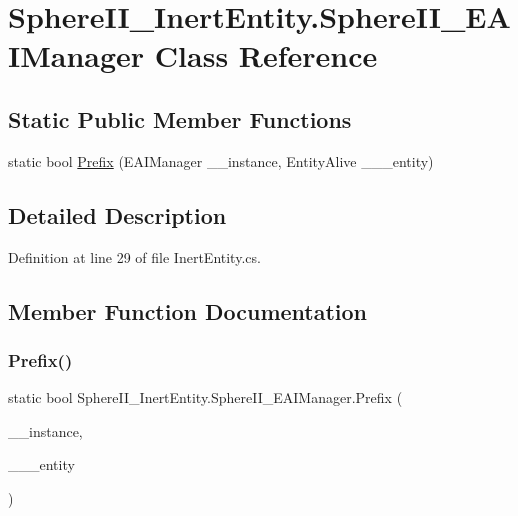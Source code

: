 \hypertarget{class_sphere_i_i___inert_entity_1_1_sphere_i_i___e_a_i_manager}{}\section{Sphere\+I\+I\+\_\+\+Inert\+Entity.\+Sphere\+I\+I\+\_\+\+E\+A\+I\+Manager Class Reference}
\label{class_sphere_i_i___inert_entity_1_1_sphere_i_i___e_a_i_manager}
\subsection*{Static Public Member Functions}
\begin{DoxyCompactItemize}
\item 
static bool \mbox{\hyperlink{class_sphere_i_i___inert_entity_1_1_sphere_i_i___e_a_i_manager_a4e6b6845934b75b7b3f49677a7e2c745}{Prefix}} (E\+A\+I\+Manager \+\_\+\+\_\+instance, Entity\+Alive \+\_\+\+\_\+\+\_\+entity)
\end{DoxyCompactItemize}


\subsection{Detailed Description}


Definition at line 29 of file Inert\+Entity.\+cs.



\subsection{Member Function Documentation}
\mbox{\label{class_sphere_i_i___inert_entity_1_1_sphere_i_i___e_a_i_manager_a4e6b6845934b75b7b3f49677a7e2c745}} 
\subsubsection{\texorpdfstring{Prefix()}{Prefix()}}
{\footnotesize\ttfamily static bool Sphere\+I\+I\+\_\+\+Inert\+Entity.\+Sphere\+I\+I\+\_\+\+E\+A\+I\+Manager.\+Prefix (\begin{DoxyParamCaption}\item[{E\+A\+I\+Manager}]{\+\_\+\+\_\+instance,  }\item[{Entity\+Alive}]{\+\_\+\+\_\+\+\_\+entity }\end{DoxyParamCaption})\hspace{0.3cm}{\ttfamily [static]}}



